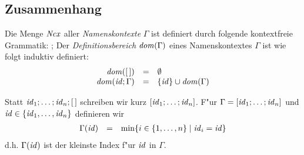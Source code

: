 \documentclass[12pt,fleqn,a4paper]{article}
\begin{document}
\subsection{Zusammenhang}

\begin{definition}[Namenskontext]
  Die Menge ${\text{\it Ncx\/}}$ aller \emph{Namenskontexte} $\Gamma$ ist definiert durch folgende kontextfreie Grammatik:
  \bgram
  \Gamma \is [\,]
  \al \id;\Gamma
  \egram
  Der \emph{Definitionsbereich} ${\text{\it dom\/}}(\Gamma)$ eines Namenskontextes $\Gamma$ ist wie folgt induktiv definiert:
  \[\begin{array}{rcl}
    {\text{\it dom\/}}([\,]) &=& \emptyset \\
    {\text{\it dom\/}}({\text{\it id\/}};\Gamma) &=& \{{\text{\it id\/}}\} \cup {\text{\it dom\/}}(\Gamma) \\
  \end{array}\]
\end{definition}

\noindent
Statt ${\text{\it id\/}}_1;\ldots;{\text{\it id\/}}_n;[\,]$ schreiben wir kurz $[{\text{\it id\/}}_1;\ldots;{\text{\it id\/}}_n]$. F"ur $\Gamma = [{\text{\it id\/}}_1;\ldots;{\text{\it id\/}}_n]$
und ${\text{\it id\/}} \in\{{\text{\it id\/}}_1,\ldots,{\text{\it id\/}}_n\}$ definieren wir
\[\begin{array}{rcl}
  \Gamma({\text{\it id\/}}) &=& \min \{i \in \{1,\ldots,n\} \mid {\text{\it id\/}}_i = {\text{\it id\/}}\}
\end{array}\]
d.h. $\Gamma({\text{\it id\/}})$ ist der kleinste Index f"ur ${\text{\it id\/}}$ in $\Gamma$.
\end{document}
